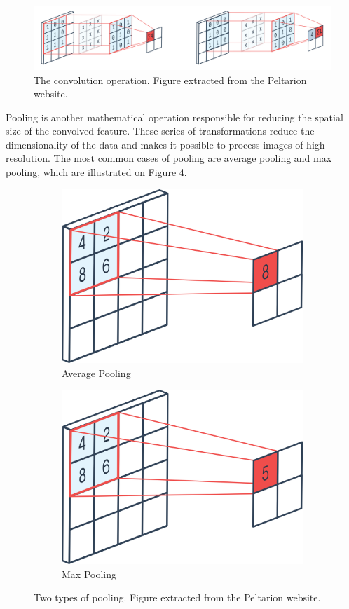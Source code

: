 \begin{figure}[h!tp]
    \centering
    \includegraphics[width=.89\textwidth]{imgs/chap3_convolution.png}
    \caption[The convolution operation.]{The convolution operation. Figure extracted from the Peltarion website\footnotemark.}
    \label{fig:convolution}
\end{figure}


Pooling is another mathematical operation responsible for reducing the spatial size of the convolved feature. These series of transformations reduce the dimensionality of the data and makes it possible to process images of high resolution. The most common cases of pooling are average pooling and max pooling, which are illustrated on Figure \ref{fig:pooling}.

\begin{figure}[h!tp]
\centering
\begin{subfigure}{.45\textwidth}
  \centering
  \includegraphics[width=.5\linewidth]{imgs/chap3_max_pooling.png}
  \caption{Average Pooling}
  \label{fig:sub1}
\end{subfigure}
\begin{subfigure}{.45\textwidth}
  \centering
  \includegraphics[width=.5\linewidth]{imgs/chap3_avg_pooling.png}
  \caption{Max Pooling}
  \label{fig:sub2}
\end{subfigure}
\caption[Two types of pooling.]{Two types of pooling. Figure extracted from the Peltarion website\footnotemark.}
\label{fig:pooling}
\end{figure}

